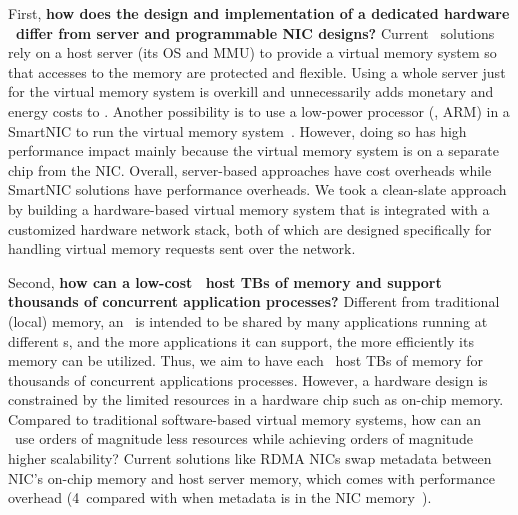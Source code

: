 First, \textbf{how does the design and implementation of a
dedicated hardware \MN\ differ from server and programmable NIC
designs?}
Current \md\ solutions rely on a host server (its OS and MMU) to provide a virtual memory system so that accesses to the memory are protected and flexible. 
Using a whole server just for the virtual memory system is overkill and unnecessarily adds monetary and energy costs to \md. %
Another possibility is to use a low-power processor (\eg, ARM) in a SmartNIC to run the virtual memory system~\cite{iPipe}. 
However, doing so has high performance impact mainly because the virtual memory system is on a separate chip from the NIC.
Overall, server-based approaches have cost overheads while SmartNIC solutions have performance overheads.
We took a clean-slate approach by building a hardware-based virtual memory system that is integrated with a customized hardware network stack, 
both of which are designed specifically for handling virtual memory requests sent over the network.

Second, \textbf{how can a low-cost \MN\ host TBs of memory and support thousands of concurrent application processes?}
Different from traditional (local) memory, an \MN\ is intended to be shared by many applications running at different \CN{}s,
and the more applications it can support, the more efficiently its memory can be utilized.
Thus, we aim to have each \MN\ host TBs of memory for thousands of concurrent applications processes.
However, a hardware design is constrained by the limited resources in a hardware chip such as on-chip memory.
Compared to traditional software-based virtual memory systems, 
how can an \MN\ use orders of magnitude less resources while achieving orders of magnitude higher scalability?
Current solutions like RDMA NICs swap metadata between NIC's on-chip memory and host server memory,
which comes with performance overhead (4\x\ compared with when metadata is in the NIC memory~\cite{Pythia}).

